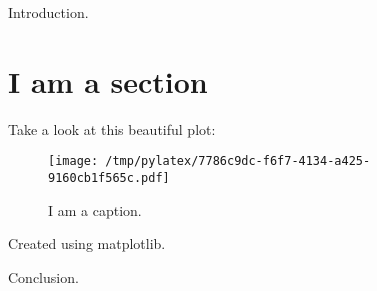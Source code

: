 \documentclass{article}%
\begin{document}
%
Introduction.%
\section*{I am a section}%
Take a look at this beautiful plot:%


\begin{figure}[htbp]%
\centering%
\texttt{[image: /tmp/pylatex/7786c9dc-f6f7-4134-a425-9160cb1f565c.pdf]}%
\caption{I am a caption.}%
\end{figure}

%
Created using matplotlib.

%
Conclusion.%
\end{document}
